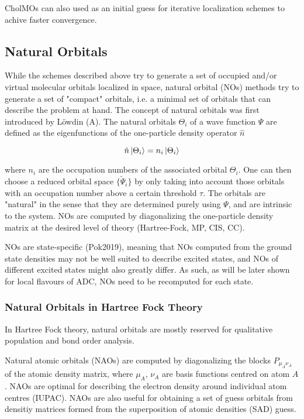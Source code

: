 CholMOs can also used as an initial guess for iterative localization schemes to achive faster convergence.  

\subsection{Natural Orbitals}

While the schemes described above try to generate a set of occupied and/or virtual molecular orbitals localized in space, natural orbital (NOs) methods try to generate a set of "compact" orbitals, i.e. a minimal set of orbitals that can describe the problem at hand. The concept of natural orbitals was first introduced by Löwdin (A). The natural orbitals $\Theta_i$ of a wave function $\Psi$ are defined as the eigenfunctions of the one-particle density operator $\hat{n}$

\begin{equation}
\hat{n}\ket{\Theta_i} = n_i \ket{\Theta_i} 
\end{equation}

\noindent where $n_i$ are the occupation numbers of the associated orbital $\Theta_i$. One can then choose a reduced orbital space $\{\tilde{\Psi}_i\}$ by only taking into account those orbitals with an occupation number above a certain threshold $\tau$. The orbitals are "natural" in the sense that they are determined purely using $\Psi$, and are intrinsic to the system. NOs are computed by diagonalizing the one-particle density matrix at the desired level of theory (Hartree-Fock, MP, CIS, CC). 

NOs are state-specific (Pok2019), meaning that NOs computed from the ground state densities may not be well suited to describe excited states, and NOs of different excited states might also greatly differ. As such, as will be later shown for local flavours of ADC, NOs need to be recomputed for each state.


\subsubsection*{Natural Orbitals in Hartree Fock Theory}

In Hartree Fock theory, natural orbitals are mostly reserved for qualitative population and bond order analysis. 

Natural atomic orbitals (NAOs) are computed by diagonalizing the blocks $P_{\mu_A\nu_A}$ of the atomic density matrix, where ${\mu_A}$, ${\nu_A}$ are basis functions centred on atom $A$. NAOs are optimal for describing the electron density around individual atom centres (IUPAC). NAOs are also useful for obtaining a set of guess orbitals from densitiy matrices formed from the superposition of atomic densities (SAD) guess. 


